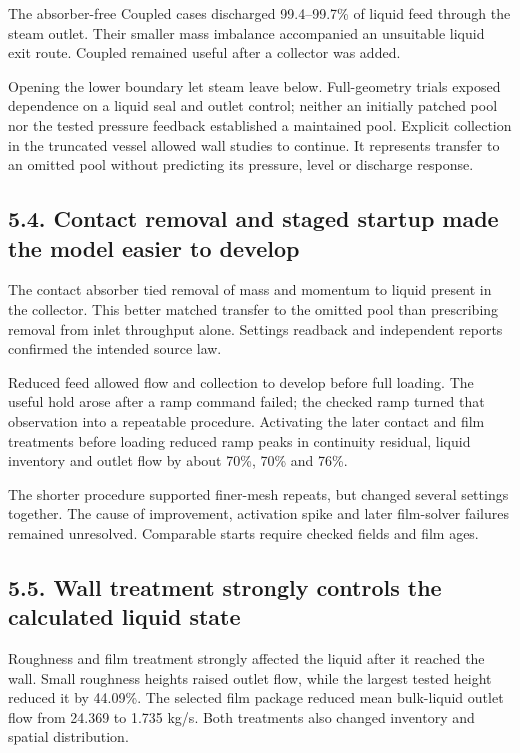 \documentclass[
  12pt,
  a4paper,
]{article}
\begin{document}
The absorber-free Coupled cases discharged 99.4--99.7\% of liquid feed
through the steam outlet. Their smaller mass imbalance accompanied an
unsuitable liquid exit route. Coupled remained useful after a collector
was added.

Opening the lower boundary let steam leave below. Full-geometry trials
exposed dependence on a liquid seal and outlet control; neither an
initially patched pool nor the tested pressure feedback established a
maintained pool. Explicit collection in the truncated vessel allowed
wall studies to continue. It represents transfer to an omitted pool
without predicting its pressure, level or discharge response.

\subsection{5.4. Contact removal and staged startup made the model
easier to
develop}\label{contact-removal-and-staged-startup-made-the-model-easier-to-develop}

The contact absorber tied removal of mass and momentum to liquid present
in the collector. This better matched transfer to the omitted pool than
prescribing removal from inlet throughput alone. Settings readback and
independent reports confirmed the intended source law.

Reduced feed allowed flow and collection to develop before full loading.
The useful hold arose after a ramp command failed; the checked ramp
turned that observation into a repeatable procedure. Activating the
later contact and film treatments before loading reduced ramp peaks in
continuity residual, liquid inventory and outlet flow by about 70\%,
70\% and 76\%.

The shorter procedure supported finer-mesh repeats, but changed several
settings together. The cause of improvement, activation spike and later
film-solver failures remained unresolved. Comparable starts require
checked fields and film ages.

\subsection{5.5. Wall treatment strongly controls the calculated liquid
state}\label{wall-treatment-strongly-controls-the-calculated-liquid-state}

Roughness and film treatment strongly affected the liquid after it
reached the wall. Small roughness heights raised outlet flow, while the
largest tested height reduced it by 44.09\%. The selected film package
reduced mean bulk-liquid outlet flow from 24.369 to 1.735 kg/s. Both
treatments also changed inventory and spatial distribution.
\end{document}
